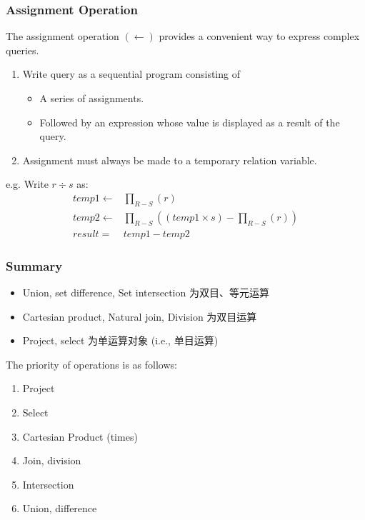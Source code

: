 \subsubsection{Assignment Operation}
The assignment operation $(\leftarrow)$ provides a convenient way to
express complex queries.
\begin{enumerate}
    \item Write query as a sequential program consisting of
    \begin{itemize}
        \item A series of assignments.
        \item Followed by an expression whose value is displayed as a result of the query.
    \end{itemize}
    \item Assignment must always be made to a temporary relation variable.
\end{enumerate}

e.g. Write $r\div s $ as:
\begin{align*}
    temp1 \leftarrow& \prod_{R-S}(r)\\
    temp2 \leftarrow& \prod_{R-S}\left((temp1\times s)-\prod_{R-S}(r)\right)\\
    result=& temp1-temp2
\end{align*}

\subsubsection{Summary}
\begin{itemize}
    \item Union, set difference, Set intersection 为双目、等元运算
    \item Cartesian product, Natural join, Division 为双目运算
    \item Project, select 为单运算对象 (i.e., 单目运算)
\end{itemize}

The priority of operations is as follows:
\begin{enumerate}
    \item Project
    \item Select
    \item Cartesian Product (times)
    \item Join, division
    \item Intersection
    \item Union, difference
\end{enumerate}

